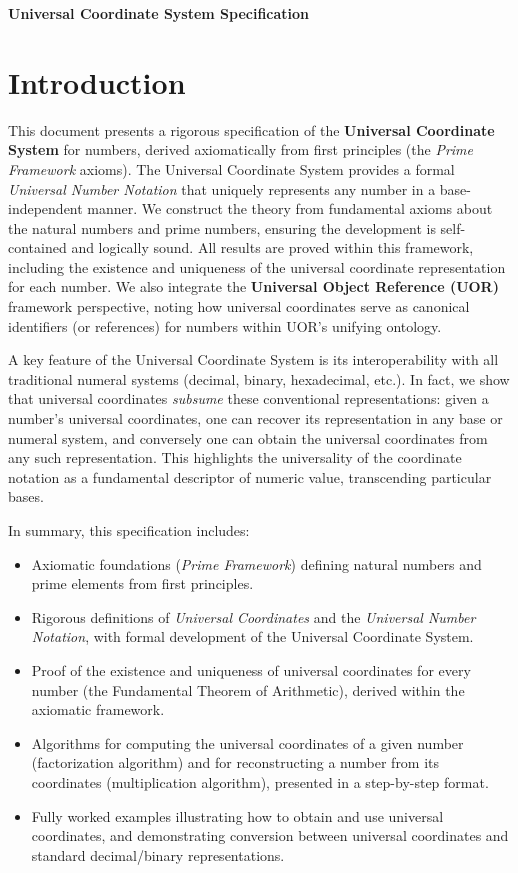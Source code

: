 \documentclass[11pt]{article}
\begin{document}
\begin{center}
{\LARGE \bf Universal Coordinate System Specification}
\end{center}
\vspace{1em}

\section*{Introduction}

This document presents a rigorous specification of the \textbf{Universal Coordinate System} for numbers, derived axiomatically from first principles (the \textit{Prime Framework} axioms). The Universal Coordinate System provides a formal \emph{Universal Number Notation} that uniquely represents any number in a base-independent manner. We construct the theory from fundamental axioms about the natural numbers and prime numbers, ensuring the development is self-contained and logically sound. All results are proved within this framework, including the existence and uniqueness of the universal coordinate representation for each number. We also integrate the \textbf{Universal Object Reference (UOR)} framework perspective, noting how universal coordinates serve as canonical identifiers (or references) for numbers within UOR's unifying ontology. 

A key feature of the Universal Coordinate System is its interoperability with all traditional numeral systems (decimal, binary, hexadecimal, etc.). In fact, we show that universal coordinates \emph{subsume} these conventional representations: given a number's universal coordinates, one can recover its representation in any base or numeral system, and conversely one can obtain the universal coordinates from any such representation. This highlights the universality of the coordinate notation as a fundamental descriptor of numeric value, transcending particular bases. 

In summary, this specification includes:
\begin{itemize}
  \item Axiomatic foundations (\textit{Prime Framework}) defining natural numbers and prime elements from first principles.
  \item Rigorous definitions of \emph{Universal Coordinates} and the \emph{Universal Number Notation}, with formal development of the Universal Coordinate System.
  \item Proof of the existence and uniqueness of universal coordinates for every number (the Fundamental Theorem of Arithmetic), derived within the axiomatic framework.
  \item Algorithms for computing the universal coordinates of a given number (factorization algorithm) and for reconstructing a number from its coordinates (multiplication algorithm), presented in a step-by-step format.
  \item Fully worked examples illustrating how to obtain and use universal coordinates, and demonstrating conversion between universal coordinates and standard decimal/binary representations.
\end{itemize}
\end{document}
